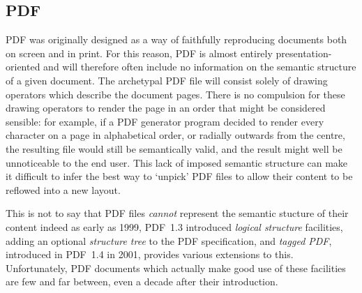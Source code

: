 \subsection{PDF}
PDF was originally designed as a way of faithfully reproducing documents both on screen and in
print. For this reason, PDF is almost entirely pre\-s\-en\-ta\-tion-oriented and will therefore
often include no information on the semantic structure of a given document. The archetypal PDF file
will consist solely of drawing operators which describe the document pages. There is no compulsion
for these drawing operators to render the page in an order that might be considered sensible: for
example, if a PDF generator program decided to render every character on a page in alphabetical
order, or radially outwards from the centre, the resulting file would still be semantically valid,
and the result might well be unnoticeable to the end user. This lack of imposed semantic structure
can make it difficult to infer the best way to `unpick' PDF files to allow their content to be
reflowed into a new layout.

This is not to say that PDF files \emph{cannot} represent the semantic stucture of their content\ed
indeed as early as 1999, PDF~1.3 introduced \emph{logical structure} facilities\cite{Adobe2001},
adding an optional \emph{structure tree} to the PDF specification, and \emph{tagged PDF}, introduced
in PDF~1.4 in 2001, provides various extensions to this. Unfortunately, PDF documents which actually
make good use of these facilities are few and far between, even a decade after their introduction.



